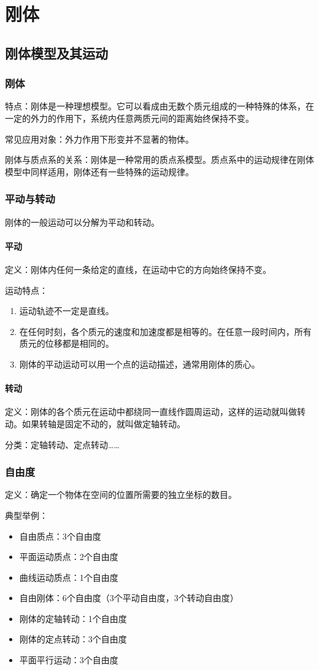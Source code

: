\chapter{刚体}
\section{刚体模型及其运动}
\subsection{刚体}
特点：刚体是一种理想模型。它可以看成由无数个质元组成的一种特殊的体系，在一定的外力的作用下，系统内任意两质元间的距离始终保持不变。

常见应用对象：外力作用下形变并不显著的物体。

刚体与质点系的关系：刚体是一种常用的质点系模型。质点系中的运动规律在刚体模型中同样适用，刚体还有一些特殊的运动规律。

\subsection{平动与转动}
刚体的一般运动可以分解为平动和转动。

\subsubsection{平动}
定义：刚体内任何一条给定的直线，在运动中它的方向始终保持不变。

运动特点：\begin{enumerate}
	\item 运动轨迹不一定是直线。
	\item 在任何时刻，各个质元的速度和加速度都是相等的。在任意一段时间内，所有质元的位移都是相同的。
	\item 刚体的平动运动可以用一个点的运动描述，通常用刚体的质心。
\end{enumerate}

\subsubsection{转动}
定义：刚体的各个质元在运动中都绕同一直线作圆周运动，这样的运动就叫做转动。如果转轴是固定不动的，就叫做定轴转动。

分类：定轴转动、定点转动……

\subsection{自由度}
定义：确定一个物体在空间的位置所需要的独立坐标的数目。

典型举例：\begin{itemize}
	\item 自由质点：3个自由度
	\item 平面运动质点：2个自由度
	\item 曲线运动质点：1个自由度
	\item 自由刚体：6个自由度（3个平动自由度，3个转动自由度）
	\item 刚体的定轴转动：1个自由度
	\item 刚体的定点转动：3个自由度
	\item 平面平行运动：3个自由度
\end{itemize}
